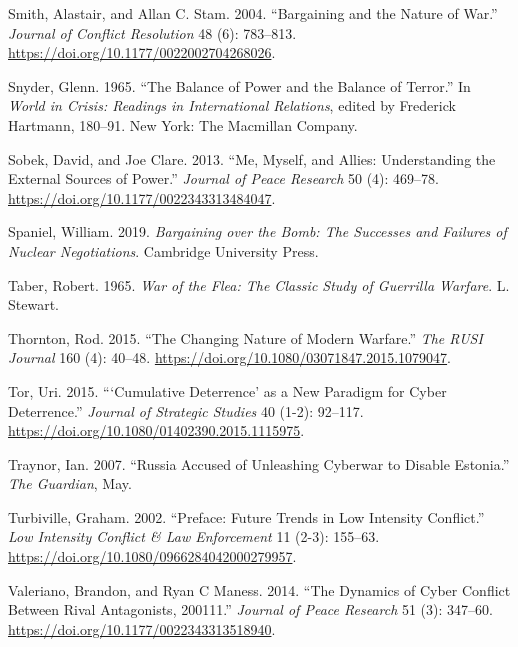 \documentclass[
]{article}
\begin{document}
\leavevmode\hypertarget{ref-smith_bargainingnaturewar_2004}{}%
Smith, Alastair, and Allan C. Stam. 2004. ``Bargaining and the Nature of War.'' \emph{Journal of Conflict Resolution} 48 (6): 783--813. \url{https://doi.org/10.1177/0022002704268026}.

\leavevmode\hypertarget{ref-snyder_balancepowerbalance_1965}{}%
Snyder, Glenn. 1965. ``The Balance of Power and the Balance of Terror.'' In \emph{World in Crisis: Readings in International Relations}, edited by Frederick Hartmann, 180--91. New York: The Macmillan Company.

\leavevmode\hypertarget{ref-sobek_memyselfallies_2013}{}%
Sobek, David, and Joe Clare. 2013. ``Me, Myself, and Allies: Understanding the External Sources of Power.'' \emph{Journal of Peace Research} 50 (4): 469--78. \url{https://doi.org/10.1177/0022343313484047}.

\leavevmode\hypertarget{ref-spaniel_bargainingbombsuccesses_2019}{}%
Spaniel, William. 2019. \emph{Bargaining over the Bomb: The Successes and Failures of Nuclear Negotiations}. Cambridge University Press.

\leavevmode\hypertarget{ref-taber_warfleaclassic_1965}{}%
Taber, Robert. 1965. \emph{War of the Flea: The Classic Study of Guerrilla Warfare}. L. Stewart.

\leavevmode\hypertarget{ref-thornton_changingnaturemodern_2015}{}%
Thornton, Rod. 2015. ``The Changing Nature of Modern Warfare.'' \emph{The RUSI Journal} 160 (4): 40--48. \url{https://doi.org/10.1080/03071847.2015.1079047}.

\leavevmode\hypertarget{ref-tor_cumulativedeterrencenew_2015}{}%
Tor, Uri. 2015. ```Cumulative Deterrence' as a New Paradigm for Cyber Deterrence.'' \emph{Journal of Strategic Studies} 40 (1-2): 92--117. \url{https://doi.org/10.1080/01402390.2015.1115975}.

\leavevmode\hypertarget{ref-traynor_russiaaccusedunleashing_2007}{}%
Traynor, Ian. 2007. ``Russia Accused of Unleashing Cyberwar to Disable Estonia.'' \emph{The Guardian}, May.

\leavevmode\hypertarget{ref-turbiville_prefacefuturetrends_2002}{}%
Turbiville, Graham. 2002. ``Preface: Future Trends in Low Intensity Conflict.'' \emph{Low Intensity Conflict \& Law Enforcement} 11 (2-3): 155--63. \url{https://doi.org/10.1080/0966284042000279957}.

\leavevmode\hypertarget{ref-valeriano_dynamicscyberconflict_2014}{}%
Valeriano, Brandon, and Ryan C Maness. 2014. ``The Dynamics of Cyber Conflict Between Rival Antagonists, 200111.'' \emph{Journal of Peace Research} 51 (3): 347--60. \url{https://doi.org/10.1177/0022343313518940}.
\end{document}
